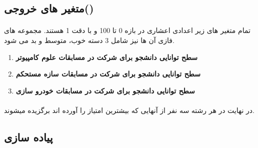 \documentclass[12pt]{article}
\begin{document}
\subsection{متغیر های خروجی()}
\paragraph{}
تمام متغیر های زیر اعدادی اعشاری در بازه 0 تا 100 و با دقت 1 هستند.
مجموعه های فازی آن ها نیز شامل 3 دسته خوب، متوسط و بد می شود.

\begin{enumerate}
    \item {
          \textbf{سطح توانایی دانشجو برای شرکت در مسابقات علوم کامپیوتر}
          }
    \item {
          \textbf{سطح توانایی دانشجو برای شرکت در مسابقات سازه مستحکم}
          }
    \item {
          \textbf{سطح توانایی دانشجو برای شرکت در مسابقات خودرو سازی}
          }
\end{enumerate}
\paragraph{}
در نهایت در هر رشته سه نفر از آنهایی که بیشترین امتیاز را آورده اند برگزیده میشوند.
\subsection{پیاده سازی}
\end{document}
